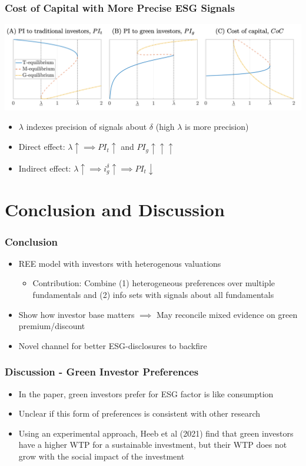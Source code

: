 \documentclass{beamer}
\begin{document}
\begin{frame}
\frametitle{Cost of Capital with More Precise ESG Signals}
\begin{center}
\includegraphics[scale=0.45]{information}
\end{center}
\begin{itemize}[<+->]
\item $\lambda$ indexes precision of signals about $\delta$ (high $\lambda$ is more precision)
\item Direct effect: $\lambda \uparrow \implies PI_t \uparrow$ and $PI_g \uparrow\uparrow\uparrow$
\item Indirect effect: $\lambda \uparrow \implies i_g^\delta \uparrow \implies PI_t \downarrow$
\end{itemize}
\end{frame}

\section{Conclusion and Discussion}

\begin{frame}
\frametitle{Conclusion}
\begin{itemize}[<+->]
\item REE model with investors with heterogenous valuations
\begin{itemize}[<+->]
\item Contribution: Combine (1) heterogeneous preferences over multiple fundamentals and (2) info sets with signals about all fundamentals
\end{itemize}
\bigskip
\item Show how investor base matters $\implies$ May reconcile mixed evidence on green premium/discount
\bigskip
\item Novel channel for better ESG-disclosures to backfire
\end{itemize}
\end{frame}


\begin{frame}
\frametitle{Discussion - Green Investor Preferences}
\begin{itemize}[<+->]
\item In the paper, green investors prefer for ESG factor is like consumption
\bigskip
\item Unclear if this form of preferences is consistent with other research
\bigskip
\item Using an experimental approach, Heeb et al (2021) find that green investors have a higher WTP for a sustainable investment, but their WTP does not grow with the social impact of the investment
\end{itemize}
\end{frame}
\end{document}
